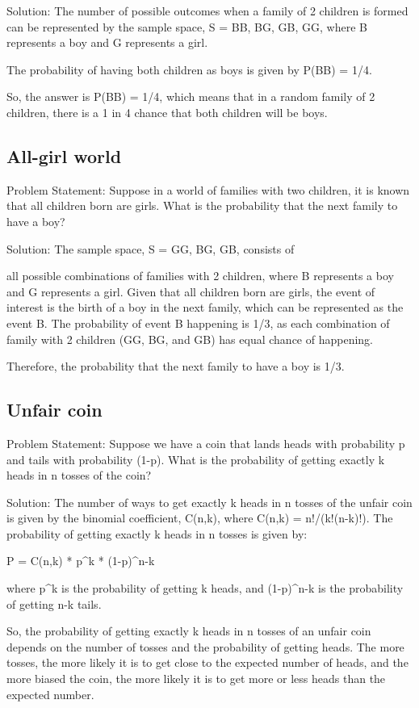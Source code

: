 \documentclass[12pt, a4paper, oneside]{article}
\begin{document}
Solution:
The number of possible outcomes when a family of 2 children is formed can be represented by the sample space, S = {BB, BG, GB, GG}, where B represents a boy and G represents a girl.

The probability of having both children as boys is given by P(BB) = 1/4.

So, the answer is P(BB) = 1/4, which means that in a random family of 2 children, there is a 1 in 4 chance that both children will be boys.
\subsection{ All-girl world }
Problem Statement:
Suppose in a world of families with two children, it is known that all children born are girls. What is the probability that the next family to have a boy?

Solution:
The sample space, S = {GG, BG, GB}, consists of

all possible combinations of families with 2 children, where B represents a boy and G represents a girl. Given that all children born are girls, the event of interest is the birth of a boy in the next family, which can be represented as the event B. The probability of event B happening is 1/3, as each combination of family with 2 children (GG, BG, and GB) has equal chance of happening.

Therefore, the probability that the next family to have a boy is 1/3.
\subsection{ Unfair coin }
Problem Statement:
Suppose we have a coin that lands heads with probability p and tails with probability (1-p). What is the probability of getting exactly k heads in n tosses of the coin?

Solution:
The number of ways to get exactly k heads in n tosses of the unfair coin is given by the binomial coefficient, C(n,k), where C(n,k) = n!/(k!(n-k)!). The probability of getting exactly k heads in n tosses is given by:

P = C(n,k) * p^k * (1-p)^{n-k}

where p^k is the probability of getting k heads, and (1-p)^{n-k} is the probability of getting n-k tails.

So, the probability of getting exactly k heads in n tosses of an unfair coin depends on the number of tosses and the probability of getting heads. The more tosses, the more likely it is to get close to the expected number of heads, and the more biased the coin, the more likely it is to get more or less heads than the expected number.
\end{document}
